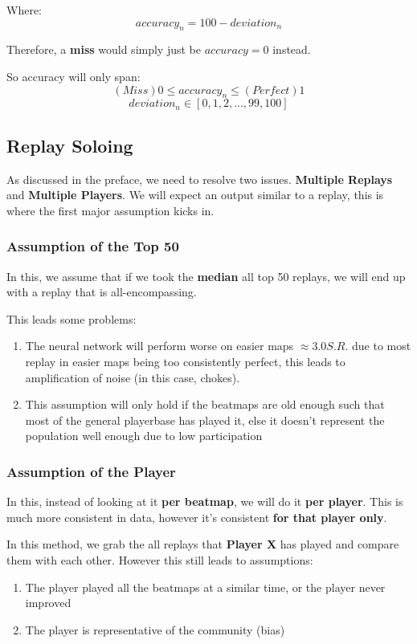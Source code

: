 Where:
$$ accuracy_n = 100 - {deviation_n} $$

Therefore, a \textbf{miss} would simply just be $accuracy = 0$ instead.

So accuracy will only span:
$$ (Miss) 0 \leq accuracy_n \leq (Perfect) 1 $$
$$ deviation_n \in [0, 1, 2, ..., 99, 100] $$

\subsection{Replay Soloing}

As discussed in the preface, we need to resolve two issues. \textbf{Multiple Replays} and \textbf{Multiple Players}. We will expect an output similar to a replay, this is where the first major assumption kicks in.

\subsubsection{Assumption of the Top 50}
In this, we assume that if we took the \textbf{median} all top 50 replays, we will end up with a replay that is all-encompassing.

This leads some problems:

\begin{enumerate}
	\item The neural network will perform worse on easier maps $ \approx 3.0 S.R. $ due to most replay in easier maps being too consistently perfect, this leads to amplification of noise (in this case, chokes).
	\item This assumption will only hold if the beatmaps are old enough such that most of the general playerbase has played it, else it doesn't represent the population well enough due to low participation
\end{enumerate}

\subsubsection{Assumption of the Player}
In this, instead of looking at it \textbf{per beatmap}, we will do it \textbf{per player}. This is much more consistent in data, however it's consistent \textbf{for that player only}.

In this method, we grab the all replays that \textbf{Player X} has played and compare them with each other. However this still leads to assumptions:

\begin{enumerate}
	\item The player played all the beatmaps at a similar time, or the player never improved
	\item The player is representative of the community (bias)
\end{enumerate}


